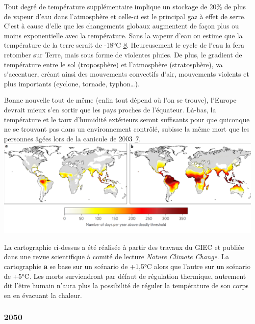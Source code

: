 Tout degré de température supplémentaire implique un stockage de 20\% de
plus de vapeur d'eau dans l'atmosphère et celle-ci est le principal gaz
à effet de serre. C'est à cause d'elle que les changements globaux
augmentent de façon plus ou moins exponentielle avec la température.
Sans la vapeur d'eau on estime que la température de la terre serait de
-18°C
\emph{\href{https://www.futura-sciences.com/planete/questions-reponses/rechauffement-climatique-vapeur-eau-elle-gaz-effet-serre-912/}{8}}.
Heureusement le cycle de l'eau la fera retomber sur Terre, mais sous
forme de violentes pluies. De plus, le gradient de température entre le
sol (troposphère) et l'atmosphère (stratosphère), va s'accentuer, créant
ainsi des mouvements convectifs d'air, mouvements violents et plus
importants (cyclone, tornade, typhon\ldots).

Bonne nouvelle tout de même (enfin tout dépend où l'on se trouve),
l'Europe devrait mieux s'en sortir que les pays proches de l'équateur.
Là-bas, la température et le taux d'humidité extérieurs seront
suffisants pour que quiconque ne se trouvant pas dans un environnement
contrôlé, subisse la même mort que les personnes âgées lors de la
canicule de 2003
\emph{\href{https://www.lemonde.fr/climat/article/2017/06/19/mourir-de-chaud-un-risque-pour-30-de-la-population-mondiale_5147554_1652612.html}{7}}.\\
\includegraphics{img/ae0c102_12566-a1oldw.pq0pl7syvi.png}

La cartographie ci-dessus a été réalisée à partir des travaux du GIEC et
publiée dans une revue scientifique à comité de lecture \emph{Nature
Climate Change}. La cartographie \textbf{a} se base sur un scénario de
+1,5°C alors que l'autre sur un scénario de +5°C. Les morts surviendront
par défaut de régulation thermique, autrement dit l'être humain n'aura
plus la possibilité de réguler la température de son corps en en
évacuant la chaleur.

\hypertarget{section}{%
\subsubsection{2050}\label{section}}

